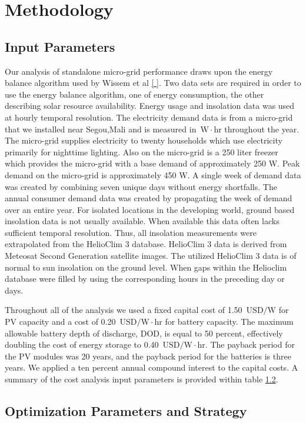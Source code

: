 \documentclass{article}
\newcommand{\unit}[1]{\ensuremath{\, \mathrm{#1}}}
\begin{document}
\section{Methodology}
\subsection{Input Parameters}
Our analysis of standalone micro-grid performance draws upon the energy balance algorithm used by Wissem et al \ref{ }. 
Two data sets are required in order to use the energy balance algorithm, one of energy consumption, the other describing solar resource availability.
Energy usage and insolation data was used at hourly temporal resolution. 
%
The electricity demand data is from a micro-grid that we installed near Segou,Mali and is measured in {\unit{W\!\cdot \! hr}} throughout the year. 
The micro-grid supplies electricity to twenty households which use electricity primarily for nighttime lighting.
Also on the micro-grid is a 250 liter freezer which provides the micro-grid with a base demand of approximately 250 W. 
Peak demand on the micro-grid is approximately 450 W. 
A single week of demand data was created by combining seven unique days without energy shortfalls. 
The annual consumer demand data was created by propagating the week of demand over an entire year.
% 
For isolated locations in the developing world, ground based insolation data is not usually available. 
When available this data often lacks sufficient temporal resolution. 
Thus, all insolation measurements were extrapolated from the HelioClim 3 database.
HelioClim 3 data is derived from Meteosat Second Generation satellite images.
The utilized HelioClim 3 data is of normal to sun insolation on the ground level.
When gaps within the Helioclim database were filled by using the corresponding hours in the preceding day or days.

Throughout all of the analysis we used a fixed capital cost of 1.50 \unit{USD/W} for PV capacity and a cost of 0.20 \unit{USD/W \! \cdot \! hr} for battery capacity.
The maximum allowable battery depth of discharge, DOD, is equal to 50 percent, effectively doubling the cost of energy storage to 0.40 \unit{USD/W \! \cdot \! hr}. 
The payback period for the PV modules was 20 years, and the payback period for the batteries is three years. 
We applied a ten percent annual compound interest to the capital costs. 
A summary of the cost analysis input parameters is provided within table \ref{}.

\subsection{Optimization Parameters and Strategy}
\end{document}
